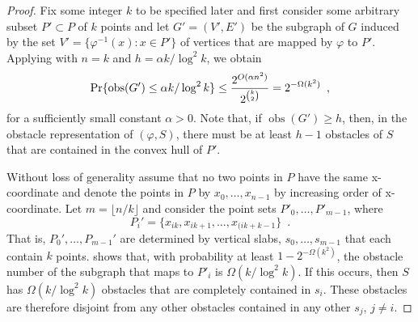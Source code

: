 \documentclass{patmorin}
\DeclareMathOperator{\obs}{obs}
\begin{document}
\begin{proof}
Fix some integer $k$ to be specified later and first consider some
arbitrary subset $P'\subset P$ of $k$ points and let $G'=(V',E')$
be the subgraph of $G$ induced by the set $V'=\{\varphi^{-1}(x):x\in
P'\}$ of vertices that are mapped by $\varphi$ to $P'$.  Applying
 with $n=k$ and $h=\alpha k/\log^2 k$, we obtain
\begin{equation}
     \Pr\{\obs(G') \le \alpha k/\log^2 k\} 
       \le \frac{2^{O(\alpha n^2)}}{2^{\binom{k}{2}}}
       = 2^{-\Omega(k^2)} \enspace , \eqlabel{g1}
\end{equation}
for a sufficiently small constant $\alpha > 0$.  Note that, if
$\obs(G')\ge h$, then, in the obstacle representation of $(\varphi,S)$,
there must be at least $h-1$ obstacles of $S$ that are contained in the
convex hull of $P'$.

Without loss of generality assume that no two points in $P$ have the
same x-coordinate and denote the points in $P$ by $x_0,\ldots,x_{n-1}$
by increasing order of x-coordinate.  Let $m=\lfloor n/k\rfloor$ and
consider the point sets $P'_0,\ldots,P'_{m-1}$, where
\[ 
  P_i'=\{x_{ik},x_{ik+1},\ldots,x_{(ik+k-1}\} \enspace .
\]  
That is, $P_0',\ldots,P_{m-1}'$ are determined by vertical slabs,
$s_0,\ldots,s_{m-1}$ that each contain $k$ points.   shows
that, with probability at least $1-2^{-\Omega(k^2)}$, the obstacle
number of the subgraph that maps to $P'_i$ is $\Omega(k/\log^2 k)$.
If this occurs, then $S$ has $\Omega(k/\log^2 k)$ obstacles that are
completely contained in $s_i$.  These obstacles are therefore disjoint
from any other obstacles contained in any other $s_j$, $j\neq i$.


\end{proof}
\end{document}
